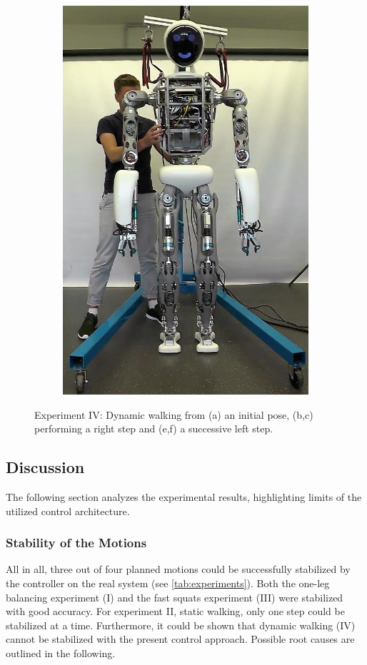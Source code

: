\begin{figure}
\begin{subfigure}{.2\textwidth}
	\includegraphics[width=.95\linewidth]{experiments/walkDynamic/snaps/5}
	\caption{}
	\end{subfigure}%
\caption[Experiment IV: Dynamic walking]{Experiment IV: Dynamic walking from (a) an initial pose, (b,c) performing a right step and (e,f) a successive left step.}
\label{exp:dynamicWalkingSnaps}
\end{figure} 

\subsection{Discussion}
The following section analyzes the experimental results, highlighting limits of the utilized control architecture.
\subsubsection{Stability of the Motions}
All in all, three out of four planned motions could be successfully stabilized by the  controller on the real system (see \cref{tab:experiments}). Both the one-leg balancing experiment (I) and the fast squats experiment (III) were stabilized with good accuracy. For experiment II, static walking, only one step could be stabilized at a time. Furthermore, it could be shown that dynamic walking (IV) cannot be stabilized with the present control approach. Possible root causes are outlined in the following. 
